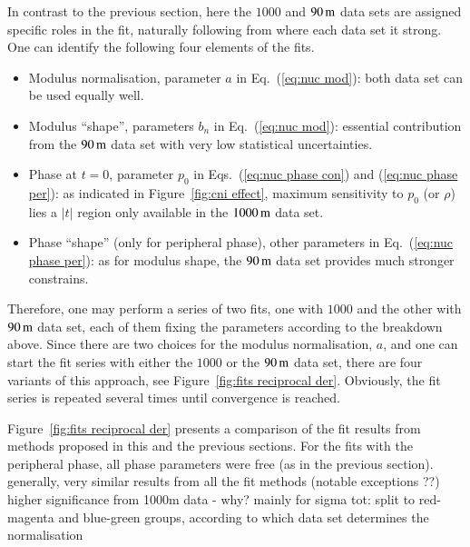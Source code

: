 In contrast to the previous section, here the $1000$ and $90\,{\rm m}$ data sets are assigned specific roles in the fit, naturally following from where each data set it strong. One can identify the following four elements of the fits.
\begin{itemize}
\item Modulus normalisation, parameter $a$ in Eq.~(\ref{eq:nuc mod}): both data set can be used equally well.
\item Modulus ``shape'', parameters $b_n$ in Eq.~(\ref{eq:nuc mod}): essential contribution from the $90\,{\rm m}$ data set with very low statistical uncertainties.
\item Phase at $t = 0$, parameter $p_0$ in Eqs.~(\ref{eq:nuc phase con}) and (\ref{eq:nuc phase per}): as indicated in Figure~\ref{fig:cni effect}, maximum sensitivity to $p_0$ (or $\rho$) lies a $|t|$ region only available in the $1000\,{\rm m}$ data set.
\item Phase ``shape'' (only for peripheral phase), other parameters in Eq.~(\ref{eq:nuc phase per}): as for modulus shape, the $90\,{\rm m}$ data set provides much stronger constrains.
\end{itemize}
Therefore, one may perform a series of two fits, one with $1000$ and the other with $90\,{\rm m}$ data set, each of them fixing the parameters according to the breakdown above. Since there are two choices for the modulus normalisation, $a$, and one can start the fit series with either the $1000$ or the $90\,{\rm m}$ data set, there are four variants of this approach, see Figure~\ref{fig:fits reciprocal der}. Obviously, the fit series is repeated several times until convergence is reached.

Figure~\ref{fig:fits reciprocal der} presents a comparison of the fit results from methods proposed in this and the previous sections. For the fits with the peripheral phase, all phase parameters were free (as in the previous section). 
\> generally, very similar results from all the fit methods (notable exceptions ??)
\> higher significance from 1000m data - why?
\> mainly for sigma tot: split to red-magenta and blue-green groups, according to which data set determines the normalisation

